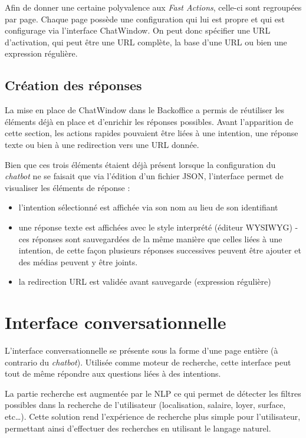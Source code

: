 \documentclass[12pt,a4paper,oneside]{scrreprt}
\begin{document}
Afin de donner une certaine polyvalence aux \textit{Fast Actions}, celle-ci sont regroupées par page. Chaque page possède une configuration qui lui est propre et qui est configurage via l'interface ChatWindow. On peut donc spécifier une URL d'activation, qui peut être une URL complète, la base d'une URL ou bien une expression régulière.

\subsection{Création des réponses}

La mise en place de ChatWindow dans le Backoffice a permis de réutiliser les éléments déjà en place et d'enrichir les réponses possibles. Avant l'apparition de cette section, les actions rapides pouvaient être liées à une intention, une réponse texte ou bien à une redirection vers une URL donnée.

Bien que ces trois éléments étaient déjà présent lorsque la configuration du \textit{chatbot} ne se faisait que via l'édition d'un fichier JSON, l'interface permet de visualiser les éléments de réponse :
\begin{itemize}
	\item l'intention sélectionné est affichée via son nom au lieu de son identifiant
	\item une réponse texte est affichées avec le style interprété (éditeur WYSIWYG)
	\subitem - ces réponses sont sauvegardées de la même manière que celles liées à une intention, de cette façon plusieurs réponses successives peuvent être ajouter et des médias peuvent y être joints.
	\item la redirection URL est validée avant sauvegarde (expression régulière)
\end{itemize}

\section{Interface conversationnelle}

L'interface conversationnelle se présente sous la forme d'une page entière (à contrario du \textit{chatbot}). Utilisée comme moteur de recherche, cette interface peut tout de même répondre aux questions liées à des intentions.

La partie recherche est augmentée par le NLP ce qui permet de détecter les filtres possibles dans la recherche de l'utilisateur (localisation, salaire, loyer, surface, etc\dots). Cette solution rend l'expérience de recherche plus simple pour l'utilisateur, permettant ainsi d'effectuer des recherches en utilisant le langage naturel.
\end{document}
